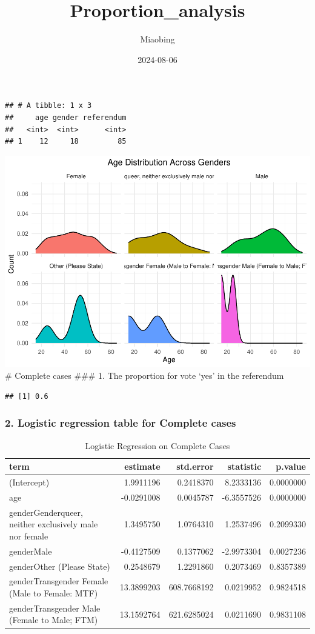 \documentclass[
]{article}
\title{Proportion\_analysis}
\author{Miaobing}
\date{2024-08-06}
\begin{document}
\maketitle

\begin{verbatim}
## # A tibble: 1 x 3
##     age gender referendum
##   <int>  <int>      <int>
## 1    12     18         85
\end{verbatim}

\includegraphics{Proportion_analysis_files/figure-latex/unnamed-chunk-4-1.pdf}
\# Complete cases \#\#\# 1. The proportion for vote `yes' in the
referendum

\begin{verbatim}
## [1] 0.6
\end{verbatim}

\subsubsection{2. Logistic regression table for Complete
cases}\label{logistic-regression-table-for-complete-cases}

\begin{longtable}[t]{lrrrr}
\caption{\label{tab:unnamed-chunk-6}Logistic Regression on Complete Cases}\\
\toprule
term & estimate & std.error & statistic & p.value\\
\midrule
(Intercept) & 1.9911196 & 0.2418370 & 8.2333136 & 0.0000000\\
age & -0.0291008 & 0.0045787 & -6.3557526 & 0.0000000\\
genderGenderqueer, neither exclusively male nor female & 1.3495750 & 1.0764310 & 1.2537496 & 0.2099330\\
genderMale & -0.4127509 & 0.1377062 & -2.9973304 & 0.0027236\\
genderOther (Please State) & 0.2548679 & 1.2291860 & 0.2073469 & 0.8357389\\
\addlinespace
genderTransgender Female (Male to Female: MTF) & 13.3899203 & 608.7668192 & 0.0219952 & 0.9824518\\
genderTransgender Male (Female to Male; FTM) & 13.1592764 & 621.6285024 & 0.0211690 & 0.9831108\\
\bottomrule
\end{longtable}
\end{document}
